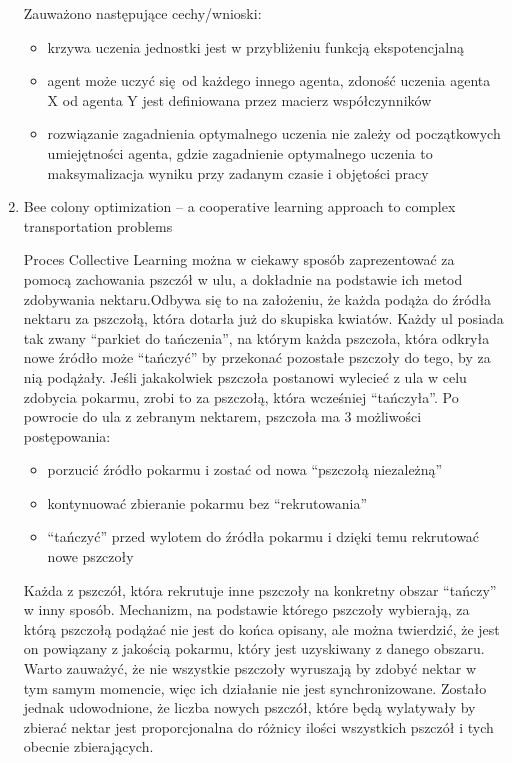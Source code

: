 \documentclass[11pt]{aghdpl}
\begin{document}
\begin{enumerate}
Zauważono następujące cechy/wnioski:

\begin{itemize}
        \item krzywa uczenia jednostki jest w przybliżeniu funkcją ekspotencjalną
        \item agent może uczyć się od każdego innego agenta, zdoność uczenia agenta X od agenta Y jest definiowana przez macierz współczynników
        \item rozwiązanie zagadnienia optymalnego uczenia nie zależy od początkowych umiejętności agenta, gdzie zagadnienie optymalnego uczenia to maksymalizacja wyniku przy zadanym czasie i objętości pracy
\end{itemize}

\item Bee colony optimization – a cooperative learning approach to complex transportation problems \cite{BeeColonyOptimization}

Proces Collective Learning można w ciekawy sposób zaprezentować za pomocą zachowania pszczół w ulu, a dokładnie na podstawie ich metod zdobywania nektaru.Odbywa się to na założeniu, że każda podąża do źródła nektaru  za pszczołą, która dotarła już do skupiska kwiatów.  Każdy ul posiada tak zwany “parkiet do tańczenia”, na którym każda pszczoła, która odkryła nowe źródło może “tańczyć” by przekonać pozostałe pszczoły do tego, by za nią podążały. Jeśli jakakolwiek pszczoła postanowi wylecieć z ula w celu zdobycia pokarmu, zrobi to za pszczołą, która wcześniej “tańczyła”. Po powrocie do ula z zebranym nektarem, pszczoła ma 3 możliwości postępowania:
\begin{itemize}
        \item porzucić źródło pokarmu i zostać od nowa “pszczołą niezależną”
        \item kontynuować zbieranie pokarmu bez “rekrutowania”
        \item “tańczyć” przed wylotem do źródła pokarmu i dzięki temu rekrutować nowe pszczoły
\end{itemize}

Każda z pszczół, która rekrutuje inne pszczoły na konkretny obszar “tańczy” w inny sposób.
Mechanizm, na podstawie którego pszczoły wybierają, za którą pszczołą podążać nie jest do końca opisany, ale można twierdzić, że jest on powiązany z jakością pokarmu, który jest uzyskiwany z danego obszaru. Warto zauważyć, że nie wszystkie pszczoły wyruszają by zdobyć nektar w tym samym momencie, więc ich działanie nie jest synchronizowane. Zostało jednak udowodnione, że liczba nowych pszczół, które będą wylatywały by zbierać nektar jest proporcjonalna do różnicy ilości wszystkich pszczół i tych obecnie zbierających.


\end{enumerate}
\end{document}
